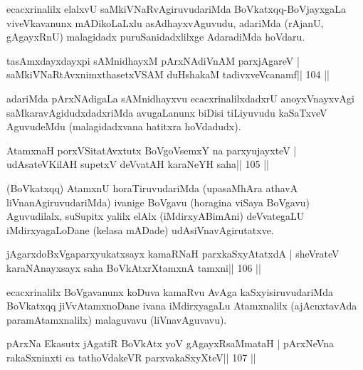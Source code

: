 \begin{artha}
ecacxrinalilx elalxvU saMkiVNaRvAgiruvudariMda BoVkatxqq-BoVjayxgaLa viveVkavanunx mADikoLaLxlu asAdhayxvAguvudu, adariMda (rAjanU, gAgayxRnU) malagidadx puruSanidadxlilxge AdaradiMda hoVdaru.
\end{artha}

\begin{shl}
tasAmxdayxdayxpi sAMnidhayxM pArxNAdiVnAM parxjAgareV |
saMkiVNaRtAvxnimxthasetxVSAM duHshakaM tadivxveVcanamf\hfill || 104 ||
\end{shl}

\begin{artha}
adariMda pArxNAdigaLa sAMnidhayxvu ecacxrinalilxdadxrU anoyxVnayxvAgi saMkaravAgidudxdadxriMda avugaLanunx biDisi tiLiyuvudu kaSaTxveV AguvudeMdu (malagidadxvana hatitxra hoVdadudx). 
\end{artha}


\begin{shl}
AtamxnaH porxVSitatAvxtutx BoVgoV\s semxY na parxyujayxteV |
udAsateV\s KilAH supetxV deVvatAH karaNeYH saha\hfill || 105 ||
\end{shl}

\begin{artha}
(BoVkatxqq) AtamxnU horaTiruvudariMda (upasaMhAra athavA liVnanAgiruvudariMda) ivanige BoVgavu (horagina viSaya BoVgavu) Aguvudilalx, suSupitx yalilx elAlx (iMdirxyABimAni) deVvategaLU iMdirxyagaLoDane (kelasa mADade) udAsiVnavAgirutatxve. 
\end{artha}


\begin{shl}
jAgarxdoBxVgaparxyukatxsayx kamaRNaH parxkaSxyAtatxdA |
sheVrateV karaNAnayxsayx saha BoVkAtxrX\s\s tamxnA \s\s tamxni\hfill || 106 ||
\end{shl}

\begin{artha}
ecacxrinalilx BoVgavanunx koDuva kamaRvu AvAga kaSxyisiruvudariMda  BoVkatxqq jiVvAtamxnoDane ivana iMdirxyagaLu Atamxnalilx (ajAcnxtavAda paramAtamxnalilx) malaguvavu (liVnavAguvavu).
\end{artha}

\begin{shl}
pArxNa Ekasutx jAgatiR BoVkAtx yoV gAgayxRsaMmataH |
pArxNeVna rakaSxninxti ca tathoVdakeVR parxvakaSxyXteV\hfill || 107 ||
\end{shl}

